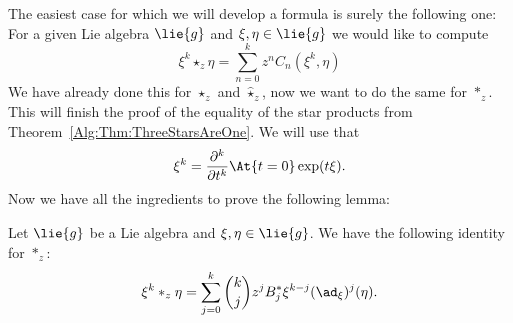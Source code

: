 The easiest case for which we will develop a formula is surely the 
following one: For a given Lie algebra $\lie{g}$ and $\xi, \eta \in 
\lie{g}$ we would like to compute
\begin{equation*}
    \xi^k \star_z \eta
    =
    \sum\limits_{n=0}^k
    z^n C_n(\xi^k, \eta)
\end{equation*}
We have already done this for $\star_z$ and $\widehat{\star}_z$, now we 
want to do the same for $\ast_z$. This will finish the proof of the equality of 
the star products from Theorem~\ref{Alg:Thm:ThreeStarsAreOne}. We will use that
\begin{equation}\label{Formulas:MonomialDerivative}
    \xi^k
    =
    \frac{\partial^k}{\partial t^k}
    \At{t = 0} \exp(t \xi).
\end{equation}
Now we have all the ingredients to prove the following lemma:
\begin{lemma}
    \label{Formulas:Lemma:LinearMonomial1}
    Let $\lie{g}$ be a Lie algebra and $\xi, \eta \in \lie{g}$. We
    have the following identity for $\ast_z$:
    \begin{equation}
        \label{Formulas:LinearMonomial1}
        \xi^k \ast_z \eta
        =
        \sum\limits_{j=0}^k
        \binom{k}{j} z^j B_j^*
        \xi^{k-j}(\ad_{\xi})^j (\eta).
    \end{equation}
\end{lemma}
